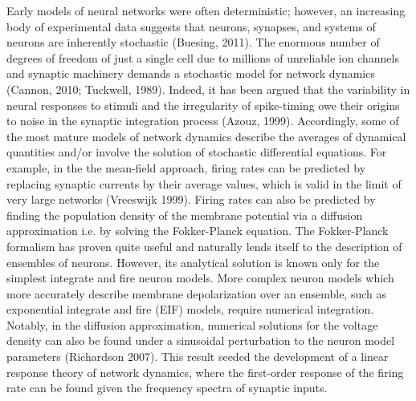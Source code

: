 \documentclass{ucetd}
\begin{document}
Early models of neural networks were often deterministic; however, an increasing body of experimental data suggests that neurons, synapses, and systems of neurons are inherently stochastic (Buesing, 2011). The enormous number of degrees of freedom of just a single cell due to millions of unreliable ion channels and synaptic machinery demands a stochastic model for network dynamics (Cannon, 2010; Tuckwell, 1989). Indeed, it has been argued that the variability in neural responses to stimuli and the irregularity of spike-timing owe their origins to noise in the synaptic integration process (Azouz, 1999). Accordingly, some of the most mature models of network dynamics describe the averages of dynamical quantities and/or involve the solution of stochastic differential equations. For example, in the the mean-field approach, firing rates can be predicted by replacing synaptic currents by their average values, which is valid in the limit of very large networks (Vreeswijk 1999). Firing rates can also be predicted by finding the population density of the membrane potential via a diffusion approximation i.e. by solving the Fokker-Planck equation. The Fokker-Planck formalism has proven quite useful and naturally lends itself to the description of ensembles of neurons. However, its analytical solution is known only for the simplest integrate and fire neuron models. More complex neuron models which more accurately describe membrane depolarization over an ensemble, such as exponential integrate and fire (EIF) models, require numerical integration. Notably, in the diffusion approximation, numerical solutions for the voltage density can also be found under a sinusoidal perturbation to the neuron model parameters (Richardson 2007). This result seeded the development of a linear response theory of network dynamics, where the first-order response of the firing rate can be found given the frequency spectra of synaptic inputs.
\end{document}

